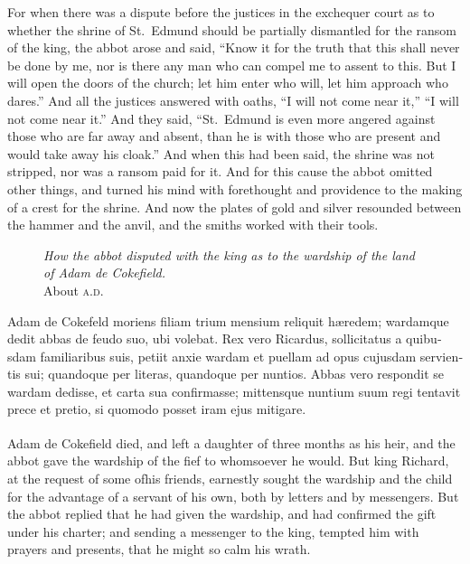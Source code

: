 \documentclass[10pt]{book}
\newcounter{engnote}
\newcommand{\engnotenum}{\textsuperscript{\arabic{engnote}\stepcounter{engnote}}}
\newcommand{\engnotetext}[1]{\vphantom{\footnotemark{}}\footnotetext{#1}}
\newcommand{\blockhead}[4][]{
\begin{figure}
\centering
\vspace{#4}
\parbox{2.75cm}{\begin{center}\footnotesize \color{BrickRed} \emph{#2}\\ #1 \end{center}}
\end{figure}
}
\begin{document}
\begin{paracol}{2}
\switchcolumn

For when there was a dispute before the justices in the exchequer court as to whether the shrine of St.\ Edmund should be partially dismantled for the ransom of the king, the abbot arose and said, ``Know it for the truth that this shall never be done by me, nor is there any man who can compel me to assent to this. But I will open the doors of the church; let him enter who will, let him approach who dares.'' And all the justices answered with oaths, ``I will not come near it,'' ``I will not come near it.'' And they said, ``St.\ Edmund is even more angered against those who are far away and absent, than he is with those who are present and would take away his cloak.'' And when this had been said, the shrine was not stripped, nor was a ransom paid for it. And for this cause the abbot omitted other things, and turned his mind with forethought and providence to the making of a crest for the shrine. And now the plates of gold and silver resounded between the hammer and the anvil, and the smiths worked with their tools.

\switchcolumn*

\begin{otherlanguage}{latin}
\blockhead[About \textsc{a.d}.\ ]{How the abbot disputed with the king as to the wardship of the land of Adam de Cokefield.}{5}{-.6cm} 
Adam de Cokefeld moriens\engnotetext{add long note here} filiam trium mensium reliquit h\ae{}redem; wardamque dedit abbas de feudo suo, ubi volebat. Rex vero Ricardus, sollicitatus a quibusdam familiaribus suis, petiit anxie wardam et puellam ad opus cujusdam servientis sui; quandoque per literas, quandoque per nuntios. Abbas vero respondit se wardam dedisse, et carta sua confirmasse; mittensque nuntium suum regi tentavit prece et pretio, si quomodo posset iram ejus mitigare. 

\end{otherlanguage}

\switchcolumn

Adam de Cokefield died,\engnotenum{} and left a daughter of three months as his heir, and the abbot gave the wardship of the fief to whomsoever he would. But king Richard, at the request of some ofhis friends, earnestly sought the wardship and the child for the advantage of a servant of his own, both by letters and by messengers. But the abbot replied that he had given the wardship, and had confirmed the gift under his charter; and sending a messenger to the king, tempted him with prayers and presents, that he might so calm his wrath.


\end{paracol}
\end{document}
